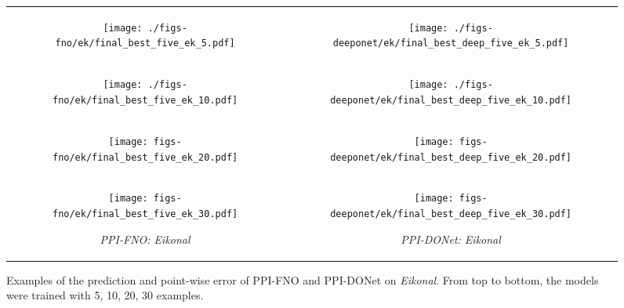 \begin{figure}
	\centering
	\setlength\tabcolsep{0pt}
	\begin{tabular}[c]{cc}
	\begin{subfigure}[b]{0.48\textwidth}
		\centering
	\texttt{[image: ./figs-fno/ek/final\_best\_five\_ek\_5.pdf]}
	\end{subfigure} &
    \begin{subfigure}[b]{0.48\textwidth}
		\centering
	\texttt{[image: 
 ./figs-deeponet/ek/final\_best\_deep\_five\_ek\_5.pdf]}
	\end{subfigure}
 \\
	\begin{subfigure}[b]{0.48\textwidth}
		\centering
		\texttt{[image: ./figs-fno/ek/final\_best\_five\_ek\_10.pdf]}
	\end{subfigure} &
 \begin{subfigure}[b]{0.48\textwidth}
		\centering
	\texttt{[image: ./figs-deeponet/ek/final\_best\_deep\_five\_ek\_10.pdf]}
	\end{subfigure}
 \\
 \begin{subfigure}[b]{0.48\textwidth}
		\centering
		\texttt{[image: figs-fno/ek/final\_best\_five\_ek\_20.pdf]}
	\end{subfigure} &
 \begin{subfigure}[b]{0.48\textwidth}
		\centering
	\texttt{[image: figs-deeponet/ek/final\_best\_deep\_five\_ek\_20.pdf]}
	\end{subfigure}
 \\
 \begin{subfigure}[b]{0.48\textwidth}
		\centering
	\texttt{[image: figs-fno/ek/final\_best\_five\_ek\_30.pdf]}
 \caption{\small \textit{PPI-FNO: Eikonal}}\label{fig:ek-fno-example}
	\end{subfigure} & 
 \begin{subfigure}[b]{0.48\textwidth}
		\centering
\texttt{[image: figs-deeponet/ek/final\_best\_deep\_five\_ek\_30.pdf]}
 \caption{\small \textit{PPI-DONet: Eikonal}}\label{fig:ek-deeponet-example}
	\end{subfigure}
\end{tabular}
	\caption{\small Examples of the prediction and point-wise error of PPI-FNO and PPI-DONet on \textit{Eikonal}.  From top to bottom, the models were trained with 5, 10, 20, 30 examples.} 
\end{figure}


